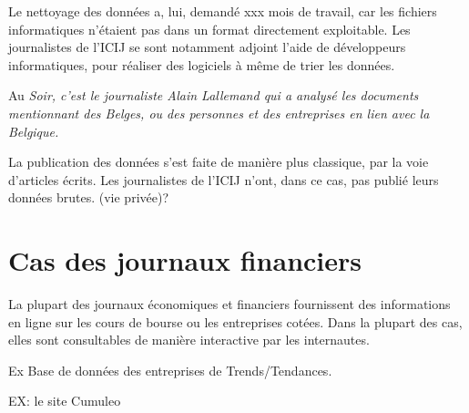 Le nettoyage des données a, lui, demandé xxx mois de travail, car les fichiers informatiques n'étaient pas dans un format directement exploitable. Les journalistes de l'ICIJ se sont notamment adjoint l'aide de développeurs informatiques, pour réaliser des logiciels à même de trier les données.

Au \em Soir\em, c'est le journaliste Alain Lallemand qui a analysé les documents mentionnant des Belges, ou des personnes et des entreprises en lien avec la Belgique.

La publication des données s'est faite de manière plus classique, par la voie d'articles écrits. Les journalistes de l'ICIJ n'ont, dans ce cas, pas publié leurs données brutes. (vie privée)?

\section{Cas des journaux financiers}

La plupart des journaux économiques et financiers fournissent des informations en ligne sur les cours de bourse ou les entreprises cotées. Dans la plupart des cas, elles sont consultables de manière interactive par les internautes.

Ex Base de données des entreprises de Trends/Tendances.


EX: le site Cumuleo
